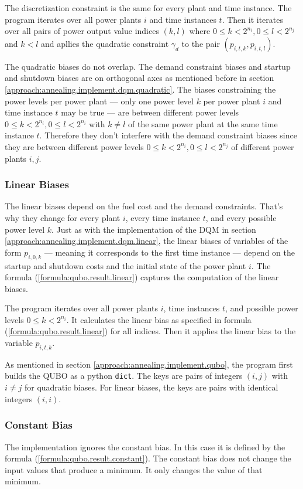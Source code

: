The discretization constraint is the same for every plant and time instance.
The program iterates over all power plants $i$ and time instances $t$.
Then it iterates over all pairs of power output value indices $(k, l)$ where $0 \leq k < 2^{n_i}, 0 \leq l < 2^{n_j}$ and $k < l$ and apllies the quadratic constraint $\gamma_d$ to the pair $(p_{i, t, k}, p_{i, t, l})$.

The quadratic biases do not overlap.
The demand constraint biases and startup and shutdown biases are on orthogonal axes as mentioned before in section \ref{approach:annealing.implement.dqm.quadratic}.
The biases constraining the power levels per power plant --- only one power level $k$ per power plant $i$ and time instance $t$ may be true
--- are between different power levels $0 \leq k < 2^{n_i}, 0 \leq l < 2^{n_i}$ with $k \neq l$ of the same power plant at the same time instance $t$.
Therefore they don't interfere with the demand constraint biases since they are between different power levels $0 \leq k < 2^{n_i}, 0 \leq l < 2^{n_j}$ of different power plants $i, j$.

\subsubsection{Linear Biases}
\label{approach:annealing.implement.qubo.linear}

The linear biases depend on the fuel cost and the demand constraints.
That's why they change for every plant $i$, every time instance $t$, and every possible power level $k$.
Just as with the implementation of the DQM in section \ref{approach:annealing.implement.dqm.linear}, the linear biases of variables of the form $p_{i, 0, k}$
--- meaning it corresponds to the first time instance ---
depend on the startup and shutdown costs and the initial state of the power plant $i$.
The formula (\ref{formula:qubo.result.linear}) captures the computation of the linear biases.

The program iterates over all power plants $i$, time instances $t$, and possible power levels $0 \leq k < 2^{n_i}$.
It calculates the linear bias as specified in formula (\ref{formula:qubo.result.linear}) for all indices.
Then it applies the linear bias to the variable $p_{i, t, k}$.

As mentioned in section \ref{approach:annealing.implement.qubo}, the program first builds the QUBO as a python \texttt{dict}.
The keys are pairs of integers $(i, j)$ with $i \neq j$ for quadratic biases.
For linear biases, the keys are pairs with identical integers $(i, i)$.

\subsubsection{Constant Bias}
\label{approach:annealing.implement.qubo.constant}

The implementation ignores the constant bias.
In this case it is defined by the formula (\ref{formula:qubo.result.constant}).
The constant bias does not change the input values that produce a minimum.
It only changes the value of that minimum.
